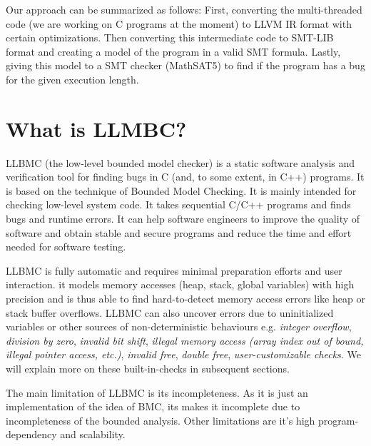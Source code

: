 \documentclass[14pt]{article}
\begin{document}
Our approach can be summarized as follows: First, converting the multi-threaded code (we are working on C programs at the moment) to LLVM IR format with certain optimizations. Then converting this intermediate code to SMT-LIB format and creating a model of the program in a valid SMT formula. Lastly, giving this model to a SMT checker (MathSAT5) to find if the program has a bug for the given execution length. 


\section{What is LLMBC?}\label{overview-LLMBC}
LLBMC (the low-level bounded model checker) is a static software analysis and verification tool for finding bugs in C (and, to some extent, in C++) programs. It is based on the technique of Bounded Model Checking. It is mainly intended for checking low-level system code.  It takes sequential C/C++ programs and finds bugs and runtime errors. It can help 
software engineers to improve the quality of software and obtain stable and secure programs and reduce the time and effort needed for software testing. 

LLBMC is fully automatic and requires minimal preparation efforts and user interaction. it models memory accesses (heap, stack, global variables) with high precision and is thus able to find hard-to-detect memory access errors like heap or stack buffer overflows. LLBMC can also uncover errors due to uninitialized variables or other sources of non-deterministic behaviours e.g.  
\textit{integer overflow}, 
\textit{division by zero},
\textit{invalid bit shift},
\textit{illegal memory access (array index out of bound, illegal pointer access, etc.)},
\textit{invalid free},
\textit{double free},
\textit{user-customizable checks}.
We will explain more on these built-in-checks in subsequent sections. 

The main limitation of LLBMC is its incompleteness. As it is just an implementation of the idea of BMC, its makes it incomplete due to incompleteness of the bounded analysis. Other limitations are it's high program-dependency and scalability. 
\end{document}
